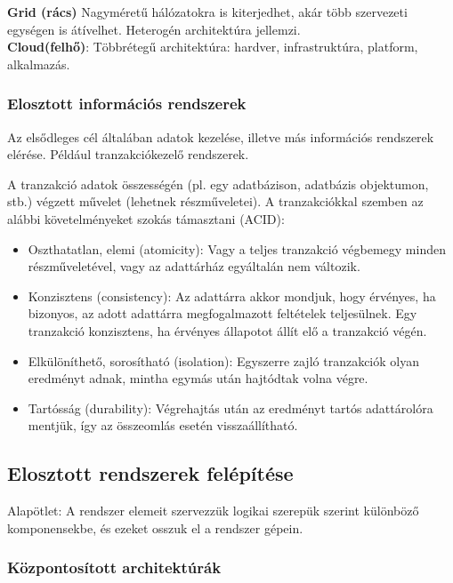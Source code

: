 \documentclass[margin=0px]{article}
\begin{document}
\noindent \textbf{Grid (rács)} Nagyméretű hálózatokra is kiterjedhet, akár több szervezeti egységen is átívelhet. Heterogén
architektúra jellemzi.\\

\noindent \textbf{Cloud(felhő)}: Többrétegű architektúra: hardver, infrastruktúra, platform, alkalmazás.

\subsubsection{Elosztott információs rendszerek}

Az elsődleges cél általában adatok kezelése, illetve más információs rendszerek elérése. Például tranzakciókezelő rendszerek.

A tranzakció adatok összességén (pl. egy adatbázison, adatbázis objektumon, stb.) végzett művelet (lehetnek részműveletei).
A tranzakciókkal szemben az alábbi követelményeket szokás támasztani (ACID):

\begin{itemize}
    \item	Oszthatatlan, elemi (atomicity): Vagy a teljes tranzakció végbemegy minden részműveletével, vagy az
          adattárház egyáltalán nem változik.

    \item	Konzisztens (consistency): Az adattárra akkor mondjuk, hogy érvényes, ha bizonyos, az adott adattárra
          megfogalmazott feltételek teljesülnek. Egy tranzakció konzisztens, ha érvényes állapotot állít elő a tranzakció
          végén.

    \item	Elkülöníthető, sorosítható (isolation): Egyszerre zajló tranzakciók olyan eredményt adnak, mintha
          egymás után hajtódtak volna végre.

    \item	Tartósság (durability): Végrehajtás után az eredményt tartós adattárolóra mentjük, így az összeomlás esetén
          visszaállítható.
\end{itemize}


\subsection{Elosztott rendszerek felépítése}
Alapötlet: A rendszer elemeit szervezzük logikai szerepük szerint különböző komponensekbe, és ezeket osszuk
el a rendszer gépein.\\

\subsubsection{Központosított architektúrák}
\end{document}
